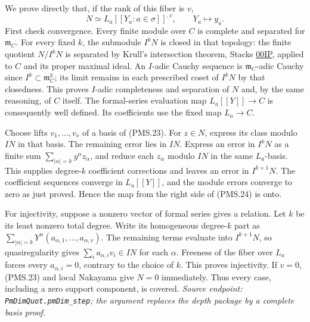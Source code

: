 We prove directly that, if the rank of this fiber is $v$,
\[
 N\simeq L_a[[Y_a:a\in\sigma]]^{,v},\qquad Y_a\mapsto y_a.
                                                        \tag{PMS.24}
\]
First check convergence.  Every finite module over $C$ is complete
and separated for $\mathfrak m_C$.  For every fixed $k$, the
submodule $I^kN$ is closed in that topology: the finite quotient
$N/I^kN$ is separated by Krull's intersection theorem, Stacks
\href{https://stacks.math.columbia.edu/tag/00IP}{00IP}, applied
to $C$ and its proper maximal ideal.  An $I$-adic Cauchy sequence
is $\mathfrak m_C$-adic Cauchy since $I^k\subset\mathfrak m_C^k$;
its limit remains in each prescribed coset of $I^kN$ by that
closedness.  This proves $I$-adic completeness and separation of
$N$ and, by the same reasoning, of $C$ itself.
The formal-series evaluation map $L_a[[Y]]\to C$ is consequently
well defined.  Its coefficients use the fixed map $L_a\to C$.

Choose lifts $v_1,\ldots,v_v$ of a basis of (PMS.23).
For $z\in N$, express its class modulo $IN$ in that basis.
The remaining error lies in $IN$.  Express an error in $I^kN$
as a finite sum $\sum_{|\alpha|=k}y^\alpha z_\alpha$, and reduce
each $z_\alpha$ modulo $IN$ in the same $L_a$-basis.
This supplies degree-$k$ coefficient corrections and leaves an
error in $I^{k+1}N$.  The coefficient sequences converge in
$L_a[[Y]]$, and the module errors converge to zero as just proved.
Hence the map from the right side of (PMS.24) is onto.

For injectivity, suppose a nonzero vector of formal series gives
a relation.  Let $k$ be its least nonzero total degree.  Write
its homogeneous degree-$k$ part as
$\sum_{|\alpha|=k}Y^\alpha(a_{\alpha,1},\ldots,a_{\alpha,v})$.
The remaining terms evaluate into $I^{k+1}N$, so quasiregularity
gives $\sum_i a_{\alpha,i}v_i\in IN$ for each $\alpha$.
Freeness of the fiber over $L_a$ forces every $a_{\alpha,i}=0$,
contrary to the choice of $k$.  This proves injectivity.
If $v=0$, (PMS.23) and local Nakayama give $N=0$ immediately.
Thus every case, including a zero support component, is covered.
\hfill\textit{Source endpoint: \texttt{PmDimQuot.pmDim\_step};
the argument replaces the depth package by a complete basis proof.}

